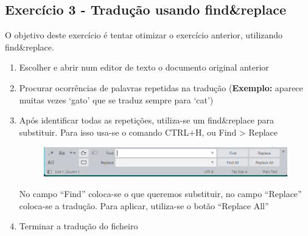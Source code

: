 \documentclass[10pt,a4paper,notitlepage]{article}
\begin{document}
\subsection*{Exercício 3 - Tradução usando find\&replace}
O objetivo deste exercício é tentar otimizar o exercício anterior, utilizando find\&replace.
\begin{enumerate}
    \item Escolher e abrir num editor de texto o documento original anterior
    \item Procurar ocorrências de palavras repetidas na tradução (\textbf{Exemplo:} aparece muitas vezes `gato' que se traduz sempre para `cat')
    \item Após identificar todas as repetições, utiliza-se um find\&replace para substituir. Para isso usa-se o comando CTRL+H, ou Find > Replace
    \begin{figure}[h!]
        \hspace{2em}
        \includegraphics[width=.7\textwidth]{findreplace.png}
        \label{fig:enter-label}
    \end{figure}
    
    No campo ``Find'' coloca-se o que queremos substituir, no campo ``Replace'' coloca-se a tradução. Para aplicar, utiliza-se o botão ``Replace All''
    \item Terminar a tradução do ficheiro    
\end{enumerate}
\end{document}
